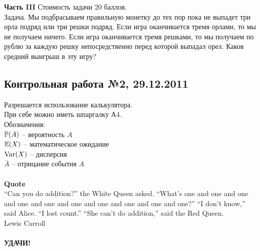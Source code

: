\documentclass[12pt, a4paper]{article}\usepackage[]{graphicx}\usepackage[]{color}
\begin{document}
\begin{enumerate}

		\end{enumerate}

		\textbf{Часть III} Стоимость задачи 20 баллов. \\

		Задача. Мы подбрасываем правильную монетку до тех пор пока не выпадет три орла подряд или три решки подряд. Если игра оканчивается тремя орлами, то мы не получаем ничего. Если игра оканчивается тремя решками, то мы получаем по рублю за каждую решку непосредственно перед которой выпадал орел. Каков средний выигрыш в эту игру?




		\subsection{Контрольная работа №2, 29.12.2011}

		Разрешается использование калькулятора.\\

		При себе можно иметь шпаргалку А4. \\

		Обозначения: \\
		$\P(A)$ -- вероятность $A$ \\
		$\E(X)$ -- математическое ожидание \\
		$\Var(X)$ -- дисперсия \\
		$\bar{A}$ -- отрицание события $A$ \\ \\




		\textbf{Quote}\\
		“Can you do addition?” the White Queen asked. “What’s one and one and one and one and one and
		one and one and one and one and one?”
		“I don’t know,” said Alice. “I lost count.”
		“She can’t do addition,” said the Red Queen. \\


		Lewis Carroll \\ \\

		\textbf{УДАЧИ!} \\
\end{document}
